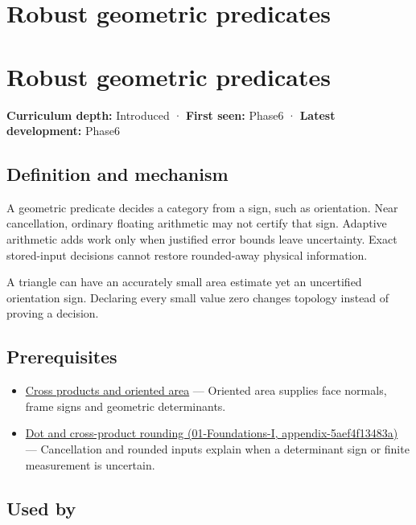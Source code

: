 \hypertarget{appendix-341296fb3f64}{}
\section*{Robust geometric predicates}
\section{Robust geometric predicates}\label{appendix-341296fb3f64-robust-geometric-predicates}

\textbf{Curriculum depth:} Introduced · \textbf{First seen:} Phase6 · \textbf{Latest development:} Phase6

\subsection{Definition and mechanism}\label{appendix-341296fb3f64-definition-and-mechanism}

A geometric predicate decides a category from a sign, such as orientation. Near cancellation, ordinary floating arithmetic may not certify that sign. Adaptive arithmetic adds work only when justified error bounds leave uncertainty. Exact stored-input decisions cannot restore rounded-away physical information.

A triangle can have an accurately small area estimate yet an uncertified orientation sign. Declaring every small value zero changes topology instead of proving a decision.

\subsection{Prerequisites}\label{appendix-341296fb3f64-prerequisites}

\begin{itemize}
\tightlist
\item
  \hyperref[appendix-2391db8052b1]{Cross products and oriented area} --- Oriented area supplies face normals, frame signs and geometric determinants.
\item
  \href{../01-Foundations-I/main.pdf\#nameddest=appendix-5aef4f13483a}{Dot and cross-product rounding (01-Foundations-I, appendix-5aef4f13483a)} --- Cancellation and rounded inputs explain when a determinant sign or finite measurement is uncertain.
\end{itemize}

\subsection{Used by}\label{appendix-341296fb3f64-used-by}

